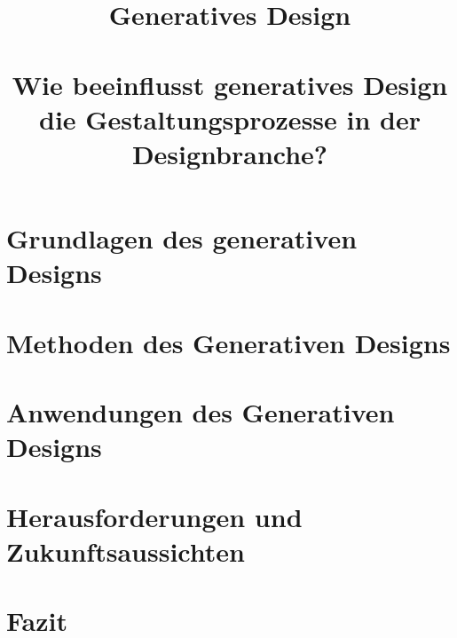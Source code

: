 \documentclass[conference]{IEEEtran}
\begin{document}
\title{Generatives Design\\
\large \ \\ \large Wie beeinflusst generatives Design die Gestaltungsprozesse in der Designbranche?}

\author{

  \and

}

\maketitle

\thispagestyle{plain} %
\pagestyle{plain} %
\setcounter{page}{1} %



\section{Grundlagen des generativen Designs}


\section{Methoden des Generativen Designs}


\section{Anwendungen des Generativen Designs}


\section{Herausforderungen und Zukunftsaussichten}


\section{Fazit}

\end{document}
